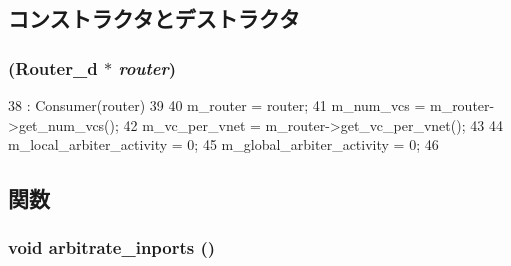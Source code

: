 \subsection{コンストラクタとデストラクタ}
\hypertarget{classSWallocator__d_a596f26738ddedb9680507152eaeb3f5c}{
\subsubsection[{SWallocator\_\-d}]{ ({\bf Router\_\-d} $\ast$ {\em router})}}
\label{classSWallocator__d_a596f26738ddedb9680507152eaeb3f5c}



\begin{DoxyCode}
38     : Consumer(router)
39 {
40     m_router = router;
41     m_num_vcs = m_router->get_num_vcs();
42     m_vc_per_vnet = m_router->get_vc_per_vnet();
43 
44     m_local_arbiter_activity = 0;
45     m_global_arbiter_activity = 0;
46 }
\end{DoxyCode}


\subsection{関数}
\hypertarget{classSWallocator__d_ad8b8a8461af75f7a4d5bd0157ad99e20}{
\subsubsection[{arbitrate\_\-inports}]{\setlength{\rightskip}{0pt plus 5cm}void arbitrate\_\-inports ()}}
\label{classSWallocator__d_ad8b8a8461af75f7a4d5bd0157ad99e20}



